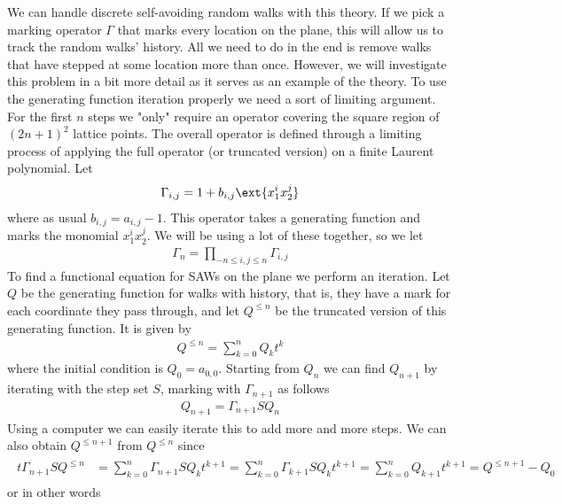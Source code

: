 \begin{example}

We can handle discrete self-avoiding random walks with this theory. If we pick a marking operator $\Gamma$ that marks every location on the plane, this will allow us to track the random walks' history. All we need to do in the end is remove walks that have stepped at some location more than once. However, we will investigate this problem in a bit more detail as it serves as an example of the theory. To use the generating function iteration properly we need a sort of limiting argument. For the first $n$ steps we "only" require an operator covering the square region of $(2n+1)^2$ lattice points. The overall operator is defined through a limiting process of applying the full operator (or truncated version) on a finite Laurent polynomial. Let
\begin{align}
\Gamma_{i,j} = 1+b_{i,j}\ext{x_1^ix_2^j}
\end{align}
where as usual $b_{i,j} = a_{i,j}-1$. This operator takes a generating function and marks the monomial $x_1^ix_2^j$. We will be using a lot of these together, so we let
\begin{align}
\Gamma_n = \prod_{-n\leq i,j\leq n}\Gamma_{i,j}
\end{align}
To find a functional equation for SAWs on the plane we perform an iteration. Let $Q$ be the generating function for walks with history, that is, they have a mark for each coordinate they pass through, and let $Q^{\leq n}$ be the truncated version of this generating function. It is given by
\begin{align}
Q^{\leq n} = \sum_{k=0}^{n} Q_k t^k
\end{align}
where the initial condition is $Q_0 = a_{0,0}$. Starting from $Q_n$ we can find $Q_{n+1}$ by iterating with the step set $S$, marking with $\Gamma_{n+1}$ as follows
\begin{align}
	Q_{n+1} = \Gamma_{n+1}SQ_n
\end{align}
Using a computer we can easily iterate this to add more and more steps. We can also obtain $Q^{\leq n+1}$ from $Q^{\leq n}$ since
\begin{align}\begin{split}
	t\Gamma_{n+1}SQ^{\leq n} & = \sum_{k=0}^n \Gamma_{n+1}SQ_kt^{k+1}= \sum_{k=0}^n \Gamma_{k+1}SQ_kt^{k+1} = \sum_{k=0}^n Q_{k+1}t^{k+1} = Q^{\leq n+1}-Q_0
\end{split}\end{align}
or in other words
\begin{align}

\end{align}
\end{example}
